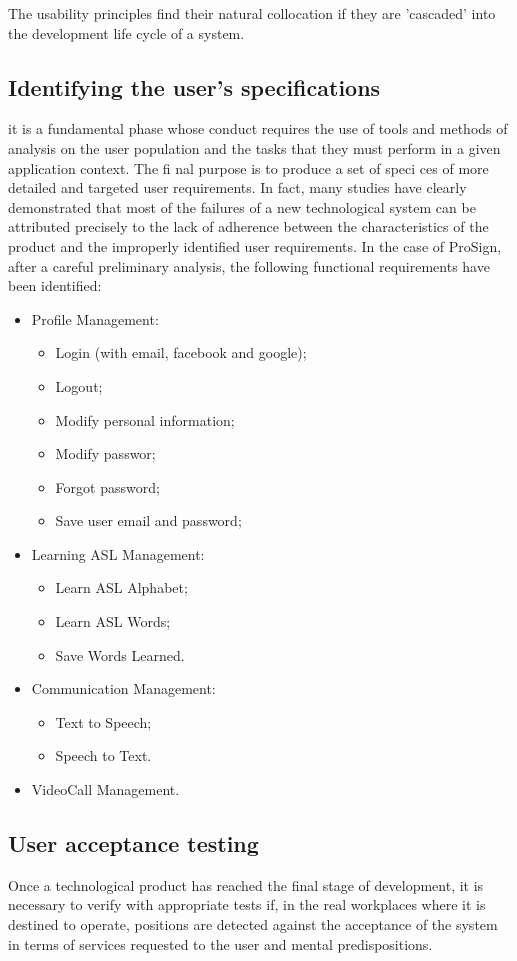 \lhead{}
The usability principles find their natural collocation if they are 'cascaded' into the development life cycle of a system.

\subsection{Identifying the user's specifications}
it is a fundamental phase whose conduct requires the use of tools and methods of analysis on the user population and the tasks that they must perform in a given application context. The fi nal purpose is to produce a set of speci ces of more detailed and targeted user requirements.
In fact, many studies have clearly demonstrated that most of the failures of a new technological system can be attributed precisely to the lack of adherence between the characteristics of the product and the improperly identified user requirements. In the case of ProSign, after a careful preliminary analysis, the following functional requirements have been identified:\\
\begin{itemize}
	\item {Profile Management:
		\begin{itemize}
			\item Login (with email, facebook and google);
			\item Logout;
			\item Modify personal information;
			\item Modify passwor;
			\item Forgot password;
			\item Save user email and password;
		\end{itemize}
	}
	\item Learning ASL Management:
	\begin{itemize}
		\item Learn ASL Alphabet;
		\item Learn ASL Words;
		\item Save Words Learned.
	\end{itemize} 
	\item Communication Management:
	\begin{itemize}
		\item Text to Speech;
		\item Speech to Text.
	\end{itemize}
	\item VideoCall Management.
\end{itemize}

\subsection{User acceptance testing}
Once a technological product has reached the final stage of development, it is necessary to verify with appropriate tests if, in the real workplaces where it is destined to operate, positions are detected against the acceptance of the system in terms of services requested to the user and mental predispositions.